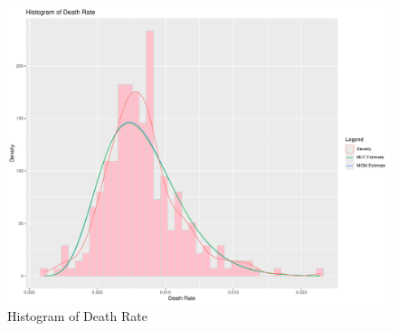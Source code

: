 \documentclass{article}\usepackage[]{graphicx}\usepackage[]{xcolor}
\makeatletter
\def\maxwidth{ %
  \ifdim\Gin@nat@width>\linewidth
    \linewidth
  \else
    \Gin@nat@width
  \fi
}
\newenvironment{knitrout}{}{} %
\makeatother
\begin{document}
\begin{figure}[H]
\begin{center}
\begin{knitrout}
\color{fgcolor}

{\centering \includegraphics[width=\maxwidth]{figure/unnamed-chunk-12-1} 

}


\end{knitrout}
\caption{Histogram of Death Rate}
\label{plot5} 
\end{center}
\end{figure}
\end{document}
